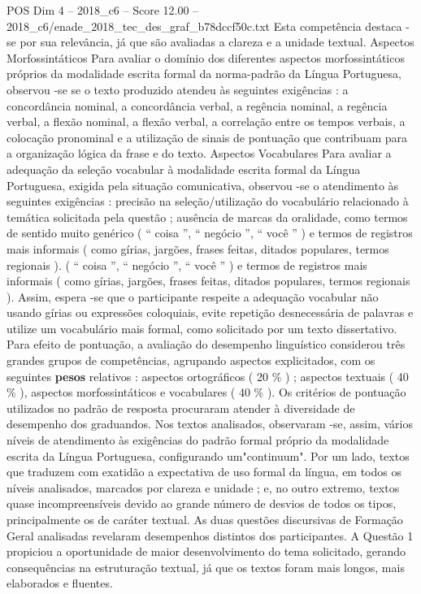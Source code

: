 \begin{textsample}{POS Dim 4 – 2018\_c6 – Score 12.00 – 2018\_c6/enade\_2018\_tec\_des\_graf\_b78dccf50c.txt}
Esta competência destaca -se por sua relevância, já que são avaliadas a clareza e a unidade textual.
Aspectos Morfossintáticos Para avaliar o domínio dos diferentes aspectos morfossintáticos próprios da modalidade escrita formal da norma-padrão da Língua Portuguesa, observou -se se o texto produzido atendeu às seguintes exigências : a concordância nominal, a concordância verbal, a regência nominal, a regência verbal, a flexão nominal, a flexão verbal, a correlação entre os tempos verbais, a colocação pronominal e a utilização de sinais de pontuação que contribuam para a organização lógica da frase e do texto.
Aspectos Vocabulares Para avaliar a adequação da seleção vocabular à modalidade escrita formal da Língua Portuguesa, exigida pela situação comunicativa, observou -se o atendimento às seguintes exigências : precisão na seleção/utilização do vocabulário relacionado à temática solicitada pela questão ; ausência de marcas da oralidade, como termos de sentido muito genérico ( “ coisa ”, “ negócio ”, “ você ” ) e termos de registros mais informais ( como gírias, jargões, frases feitas, ditados populares, termos regionais ). ( “ coisa ”, “ negócio ”, “ você ” ) e termos de registros mais informais ( como gírias, jargões, frases feitas, ditados populares, termos regionais ).
Assim, espera -se que o participante respeite a adequação vocabular não usando gírias ou expressões coloquiais, evite repetição desnecessária de palavras e utilize um vocabulário mais formal, como solicitado por um texto dissertativo.
Para efeito de pontuação, a avaliação do desempenho linguístico considerou três grandes grupos de competências, agrupando aspectos explicitados, com os seguintes \textbf{pesos} relativos : aspectos ortográficos ( 20 \% ) ; aspectos textuais ( 40 \% ), aspectos morfossintáticos e vocabulares ( 40 \% ).
Os critérios de pontuação utilizados no padrão de resposta procuraram atender à diversidade de desempenho dos graduandos.
Nos textos analisados, observaram -se, assim, vários níveis de atendimento às exigências do padrão formal próprio da modalidade escrita da Língua Portuguesa, configurando um"continuum".
Por um lado, textos que traduzem com exatidão a expectativa de uso formal da língua, em todos os níveis analisados, marcados por clareza e unidade ; e, no outro extremo, textos quase incompreensíveis devido ao grande número de desvios de todos os tipos, principalmente os de caráter textual.
As duas questões discursivas de Formação Geral analisadas revelaram desempenhos distintos dos participantes.
A Questão 1 propiciou a oportunidade de maior desenvolvimento do tema solicitado, gerando consequências na estruturação textual, já que os textos foram mais longos, mais elaborados e fluentes.

\end{textsample}

